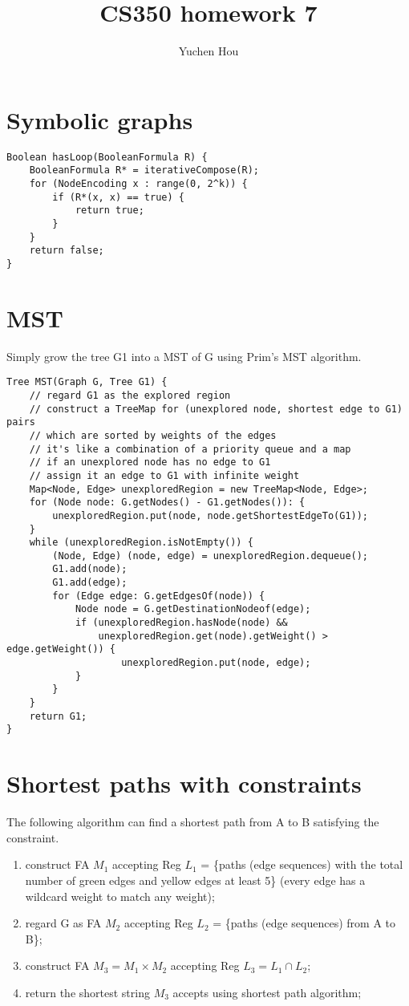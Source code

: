\documentclass{article}
\begin{document}
\lstset{language=Java, tabsize=4}
\title{CS350 homework 7}
\author{Yuchen Hou}
\maketitle

\section{Symbolic graphs}
\begin{lstlisting}
Boolean hasLoop(BooleanFormula R) {
	BooleanFormula R* = iterativeCompose(R);
	for (NodeEncoding x : range(0, 2^k)) {
		if (R*(x, x) == true) {
			return true;
		}
	}
	return false;
}
\end{lstlisting}

\section{MST}
Simply grow the tree G1 into a MST of G using Prim's MST algorithm.
\begin{lstlisting}
Tree MST(Graph G, Tree G1) {
	// regard G1 as the explored region
	// construct a TreeMap for (unexplored node, shortest edge to G1) pairs
	// which are sorted by weights of the edges
	// it's like a combination of a priority queue and a map
	// if an unexplored node has no edge to G1
	// assign it an edge to G1 with infinite weight
	Map<Node, Edge> unexploredRegion = new TreeMap<Node, Edge>;
	for (Node node: G.getNodes() - G1.getNodes()): {
		unexploredRegion.put(node, node.getShortestEdgeTo(G1));
	}
	while (unexploredRegion.isNotEmpty()) {
		(Node, Edge) (node, edge) = unexploredRegion.dequeue();
		G1.add(node);
		G1.add(edge);
		for (Edge edge: G.getEdgesOf(node)) {
			Node node = G.getDestinationNodeof(edge);
			if (unexploredRegion.hasNode(node) &&
				unexploredRegion.get(node).getWeight() > edge.getWeight()) {
					unexploredRegion.put(node, edge);
			}
		}
	}
	return G1;
}
\end{lstlisting}

\section{Shortest paths with constraints}
The following algorithm can find a shortest path from A to B satisfying the
constraint.
\begin{enumerate}
  \item construct FA $M_1$ accepting Reg $L_1$ = \{paths (edge sequences) with
  the total number of green edges and yellow edges at least 5\} (every edge has
  a wildcard weight to match any weight);
  \item regard G as FA $M_2$ accepting Reg $L_2$ = \{paths (edge sequences) from
  A to B\};
  \item construct FA $M_3 = M_1 \times M_2$ accepting Reg $L_3 = L_1 \cap L_2$;
  \item return the shortest string $M_3$ accepts using shortest path algorithm;
\end{enumerate}
\end{document}

